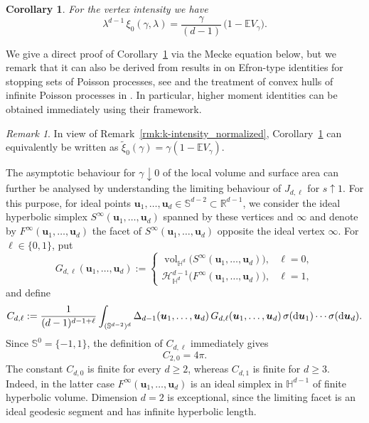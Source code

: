\documentclass[11pt,a4paper]{article}
\theoremstyle{plain}
\newtheorem{corollary}[theorem]{Corollary}
\theoremstyle{definition}
\theoremstyle{remark}
\newtheorem{remark}[theorem]{Remark}
\newcommand{\dint}{\textup{d}}
\newcommand{\vol}{\mathop{\mathrm{vol}}\nolimits}
\newcommand{\bu}{\boldsymbol{u}}
\def\EE{\mathbb{E}}
\def\HH{\mathbb{H}}
\def\RR{\mathbb{R}}
\def\SS{\mathbb{S}}
\def\cH{\mathcal{H}}
\begin{document}
\begin{corollary}\label{cor:Efron}
	For the vertex intensity we have
	\[
		\lambda^{d-1}\, \xi_0(\gamma,\lambda)
		=\frac{\gamma}{(d-1)}\,
		\bigl(1- \EE V_{\gamma}\bigr).
	\]
\end{corollary}

We give a direct proof of Corollary~\ref{cor:Efron} via the Mecke equation below, but we remark that it can also be derived from results in \cite{LM:2026} on Efron-type identities for stopping sets of Poisson processes, see \cite[Corollary~4.3]{LM:2026} and the treatment of convex hulls of infinite Poisson processes in \cite[Section 7]{LM:2026}. In particular, higher moment identities can be obtained immediately using their framework.

\begin{remark}
	In view of Remark~\ref{rmk:k-intensity_normalized}, Corollary~\ref{cor:Efron} can equivalently be written as $\tilde{\xi}_0(\gamma) = \gamma (1-\EE V_{\gamma})$.
\end{remark}


The asymptotic behaviour for $\gamma\downarrow 0$
of the local volume and surface area can further be analysed by understanding the limiting behaviour of $J_{d,\ell}$ for $s\uparrow 1$.
For this purpose, for ideal points $\bu_1,\dotsc,\bu_d \in \SS^{d-2} \subset \RR^{d-1}$, we consider the ideal hyperbolic simplex $S^{\infty}(\bu_1,\dotsc,\bu_d)$ spanned by these vertices and $\infty$ and denote by $F^\infty(\bu_1,\dotsc,\bu_d)$ the facet of $S^\infty(\bu_1,\dotsc,\bu_d)$ opposite the ideal vertex $\infty$.
For $\ell\in\{0,1\}$, put
\begin{equation}\label{eq:Gdl}
	G_{d,\ell}(\bu_1,\ldots,\bu_d)
	:=
	\begin{cases}
		\vol_{\HH^d}\bigl(
		S^\infty(\bu_1,\ldots,\bu_d)
		\bigr), & \ell=0, \\[1mm]
		\cH_{\HH^d}^{d-1}\bigl(
		F^\infty(\bu_1,\ldots,\bu_d)
		\bigr), & \ell=1,
	\end{cases}
\end{equation}
and define
\[
	C_{d,\ell}
	:=
	\frac{1}{(d-1)^{d-1+\ell}}
	\int_{(\SS^{d-2})^d}
	\Delta_{d-1}(\bu_1,\ldots,\bu_d)\,
	G_{d,\ell}(\bu_1,\ldots,\bu_d)\,
	\sigma(\dint\bu_1)\cdots\sigma(\dint\bu_d).
\]
Since \(\SS^0=\{-1,1\}\), the definition of \(C_{d,\ell}\) immediately
gives
\begin{equation}\label{eq:C20}
	C_{2,0}=4\pi.
\end{equation}
The constant $C_{d,0}$ is finite for every $d\ge2$, whereas
$C_{d,1}$ is finite for $d\ge3$. Indeed, in the latter case
$F^\infty(\bu_1,\ldots,\bu_d)$ is an ideal simplex in
$\HH^{d-1}$ of finite hyperbolic volume. Dimension $d=2$ is
exceptional, since the limiting facet is an ideal geodesic segment and has
infinite hyperbolic length.
\end{document}
